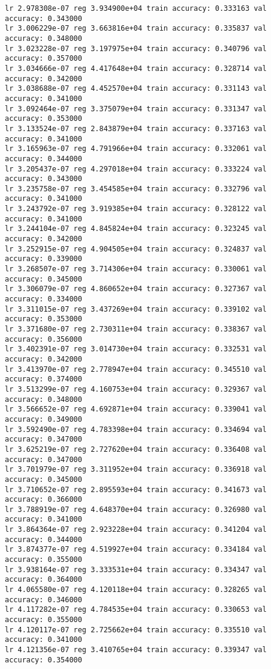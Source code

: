 \documentclass[11pt]{article}
\begin{document}
\begin{Verbatim}[commandchars=\\\{\}]
lr 2.978308e-07 reg 3.934900e+04 train accuracy: 0.333163 val accuracy: 0.343000
lr 3.006229e-07 reg 3.663816e+04 train accuracy: 0.335837 val accuracy: 0.348000
lr 3.023228e-07 reg 3.197975e+04 train accuracy: 0.340796 val accuracy: 0.357000
lr 3.034666e-07 reg 4.417648e+04 train accuracy: 0.328714 val accuracy: 0.342000
lr 3.038688e-07 reg 4.452570e+04 train accuracy: 0.331143 val accuracy: 0.341000
lr 3.092464e-07 reg 3.375079e+04 train accuracy: 0.331347 val accuracy: 0.353000
lr 3.133524e-07 reg 2.843879e+04 train accuracy: 0.337163 val accuracy: 0.341000
lr 3.165963e-07 reg 4.791966e+04 train accuracy: 0.332061 val accuracy: 0.344000
lr 3.205437e-07 reg 4.297018e+04 train accuracy: 0.333224 val accuracy: 0.343000
lr 3.235758e-07 reg 3.454585e+04 train accuracy: 0.332796 val accuracy: 0.341000
lr 3.243792e-07 reg 3.919385e+04 train accuracy: 0.328122 val accuracy: 0.341000
lr 3.244104e-07 reg 4.845824e+04 train accuracy: 0.323245 val accuracy: 0.342000
lr 3.252915e-07 reg 4.904505e+04 train accuracy: 0.324837 val accuracy: 0.339000
lr 3.268507e-07 reg 3.714306e+04 train accuracy: 0.330061 val accuracy: 0.345000
lr 3.306079e-07 reg 4.860652e+04 train accuracy: 0.327367 val accuracy: 0.334000
lr 3.311015e-07 reg 3.437269e+04 train accuracy: 0.339102 val accuracy: 0.353000
lr 3.371680e-07 reg 2.730311e+04 train accuracy: 0.338367 val accuracy: 0.356000
lr 3.402391e-07 reg 3.014730e+04 train accuracy: 0.332531 val accuracy: 0.342000
lr 3.413970e-07 reg 2.778947e+04 train accuracy: 0.345510 val accuracy: 0.374000
lr 3.513299e-07 reg 4.160753e+04 train accuracy: 0.329367 val accuracy: 0.348000
lr 3.566652e-07 reg 4.692871e+04 train accuracy: 0.339041 val accuracy: 0.349000
lr 3.592490e-07 reg 4.783398e+04 train accuracy: 0.334694 val accuracy: 0.347000
lr 3.625219e-07 reg 2.727620e+04 train accuracy: 0.336408 val accuracy: 0.347000
lr 3.701979e-07 reg 3.311952e+04 train accuracy: 0.336918 val accuracy: 0.345000
lr 3.710652e-07 reg 2.895593e+04 train accuracy: 0.341673 val accuracy: 0.366000
lr 3.788919e-07 reg 4.648370e+04 train accuracy: 0.326980 val accuracy: 0.341000
lr 3.864364e-07 reg 2.923228e+04 train accuracy: 0.341204 val accuracy: 0.344000
lr 3.874377e-07 reg 4.519927e+04 train accuracy: 0.334184 val accuracy: 0.355000
lr 3.938164e-07 reg 3.333531e+04 train accuracy: 0.334347 val accuracy: 0.364000
lr 4.065580e-07 reg 4.120118e+04 train accuracy: 0.328265 val accuracy: 0.346000
lr 4.117282e-07 reg 4.784535e+04 train accuracy: 0.330653 val accuracy: 0.355000
lr 4.120117e-07 reg 2.725662e+04 train accuracy: 0.335510 val accuracy: 0.341000
lr 4.121356e-07 reg 3.410765e+04 train accuracy: 0.339347 val accuracy: 0.354000

\end{Verbatim}
\end{document}
